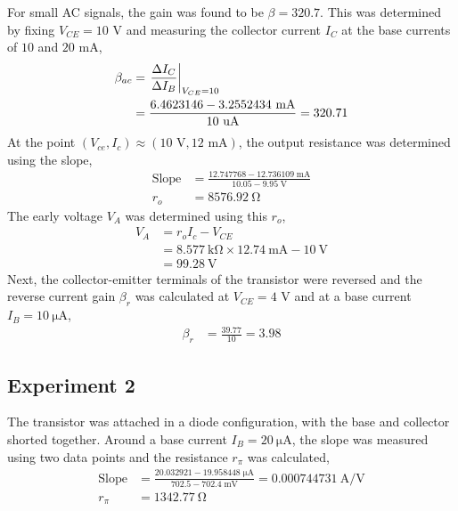 \documentclass{homework}
\begin{document}
	\noindent For small AC signals, the gain was found to be $\beta=320.7$. This was determined by fixing $V_{CE} = 10$ V and measuring the collector current $I_C$ at the base currents of $10$ and $20$ mA, \begin{align*}
		\beta_{ac} & = \eval{ \frac{\Delta I_C}{\Delta I_B} }_{V_{CE} = 10} \\
			& = \frac{6.4623146 - 3.2552434 \text{ mA}}{10 \text{ uA}} = 320.71
	\end{align*}
	At the point $(V_{ce}, I_c) \approx (10 \text{ V}, 12 \text{ mA})$, the output resistance was determined using the slope, \begin{align*}
		\text{Slope} & = \frac{12.747768 - 12.736109\; \si{\mA}}{10.05 - 9.95 \; \si{\V}} \\
		r_o & = \SI{8576.92}{\ohm}
	\end{align*}
	The early voltage $V_A$ was determined using this $r_o$, \begin{align*}
		V_A & = r_o I_c - V_{CE} \\
			& = \SI{8.577}{\kohm} \times \SI{12.74}{\mA} - \SI{10}{\V} \\
			& = \SI{99.28}{\V}
	\end{align*}
	Next, the collector-emitter terminals of the transistor were reversed and the reverse current gain $\beta_r$ was calculated at $V_{CE} = 4$ V and at a base current $I_B = \SI{10}{\uA}$, \begin{align*}
		\beta_r & = \frac{39.77}{10} = 3.98
	\end{align*}
	\vspace{-2em}
	\subsection*{Experiment 2}
	\vspace{-0.2em}
	The transistor was attached in a diode configuration, with the base and collector shorted together. Around a base current $I_B = \SI{20}{\uA}$, the slope was measured using two data points and the resistance $r_\pi$ was calculated, \begin{align*}
		\text{Slope} & = \frac{20.032921 - 19.958448 \; \si{\uA}}{702.5 - 702.4 \; \si{\mV}} = \SI{0.000744731}{\A/\V} \\
		r_\pi & = \SI{1342.77}{\ohm}
	\end{align*}
\end{document}
